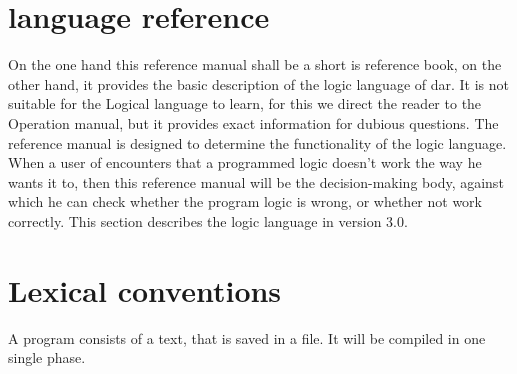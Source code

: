 
\newcommand{\bi}{\begin{itemize}}
\newcommand{\ei}{\end{itemize}}


\pagestyle{headings}

\chapter{language reference}\label{cha:sprachreferenz}
\label{eins}

On the one hand this reference manual shall be a short
is reference book, on the other hand, it provides the basic
description of 
the logic language of \mutabor{} dar. It is not suitable for the
Logical language to learn, for this we direct the reader to the
Operation manual, but it provides exact information for dubious
questions.
The reference manual is designed to
determine the functionality of the logic language. When a user
 of \mutabor{} encounters that a programmed logic 
doesn't work the way he wants it to, then this
reference manual will be the decision-making body, against which he
can check whether the program logic is wrong, or whether
\mutabor{} not work correctly.
This section describes the logic language \mutabor{} in version 3.0.
\iffalse
Das Referenzhandbuch soll einerseits ein kurzes
Nachschlagewerk sein, andererseits stellt es die Basisbeschreibung
der Logiksprache \mutabor{} dar. Es ist nicht dafür geeignet, die
Logiksprache zu erlernen, dafür sei an dieser Stelle auf das
Bedienungshandbuch verwiesen, sondern gibt bei zweifelhaften
Fragen exakte Auskünfte. Das Referenzhandbuch ist dafür gedacht,
die Funktionalität der Logiksprache festzulegen. Wenn ein Benutzer
von \mutabor{} feststellt, daß eine von ihm programmierte Logik
nicht so funktioniert, wie er es wünscht, so ist dieses
Referenzhandbuch die Entscheidungsinstanz, anhand derer man
feststellen kann, ob das Logikprogramm falsch ist, oder ob
\mutabor{} nicht korrekt funktioniert.
Dieser Abschnitt beschreibt die Logiksprache \mutabor{} in der Version
3.0.
\fi


\chapter{Lexical conventions}\label{cha:lexik-konv}
\label{zwei}

A program consists of a text, that is saved in a file. It will be
compiled in one single phase.
\iffalse
Ein Programm besteht aus einem Text, der in einer Datei gespeichert ist.
Es wird in einer einzigen Phase übersetzt.
\fi

